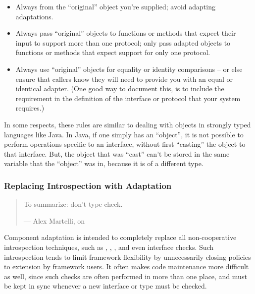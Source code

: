 \begin{verbatim%
}
\begin{verbatim%
}
\begin{itemize}

\item Always  from the ``original'' object you're supplied;
avoid adapting adaptations.

\item Always pass ``original'' objects to functions or methods that expect
their input to support more than one protocol; only pass adapted objects to
functions or methods that expect support for only one protocol.

\item Always use ``original'' objects for equality or identity comparisons --
or else ensure that callers know they will need to provide you with an equal or
identical adapter.  (One good way to document this, is to include the
requirement in the definition of the interface or protocol that your system
requires.)

\end{itemize}

In some respects, these rules are similar to dealing with objects in strongly
typed languages like Java.  In Java, if one simply has an ``object'', it is not
possible to perform operations specific to an interface, without first
``casting'' the object to that interface.  But, the object that was ``cast''
can't be stored in the same variable that the ``object'' was in, because it
is of a different type.


















\subsubsection{Replacing Introspection with Adaptation\label{replintrowadapt}}

\begin{quotation}
To summarize: don't type check.

\hfill --- Alex Martelli, on 
\end{quotation}

Component adaptation is intended to completely replace all non-cooperative
introspection techniques, such as , ,
, and even interface checks.  Such introspection
tends to limit framework flexibility by unnecessarily closing policies to
extension by framework users.  It often makes code maintenance more difficult
as well, since such checks are often performed in more than one place, and
must be kept in sync whenever a new interface or type must be checked.


\end{verbatim%
}
\end{verbatim%
}
